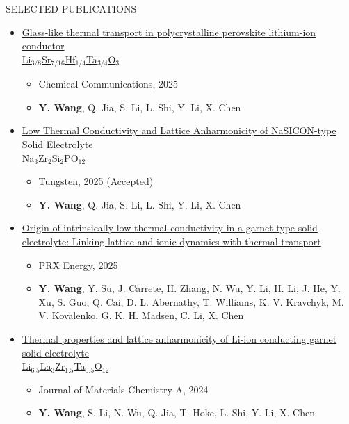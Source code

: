 \documentclass{resume} %
\begin{document}
\begin{rSection}{SELECTED PUBLICATIONS}
\begin{itemize}
\item \href{https://doi.org/10.1039/D5CC04693A}{Glass-like thermal transport in polycrystalline perovskite lithium-ion conductor \\ Li$_{3/8}$Sr$_{7/16}$Hf$_{1/4}$Ta$_{3/4}$O$_3$}
    \begin{itemize}
        \item Chemical Communications, 2025
        \item \textbf{Y. Wang}, Q. Jia, S. Li, L. Shi, Y. Li, X. Chen
    \end{itemize}

\item \href{https://doi.org/10.1007/s42864-025-00357-6}{Low Thermal Conductivity and Lattice Anharmonicity of NaSICON-type Solid Electrolyte \\ Na$_3$Zr$_2$Si$_2$PO$_{12}$}
    \begin{itemize}
        \item Tungsten, 2025 (Accepted)
        \item \textbf{Y. Wang}, Q. Jia, S. Li, L. Shi, Y. Li, X. Chen
    \end{itemize}

\item \href{https://doi.org/10.1103/6wj2-kzhh}{Origin of intrinsically low thermal conductivity in a garnet-type solid electrolyte: Linking lattice and ionic dynamics with thermal transport}
    \begin{itemize}
        \item PRX Energy, 2025
        \item \textbf{Y. Wang}, Y. Su, J. Carrete, H. Zhang, N. Wu, Y. Li, H. Li, J. He, Y. Xu, S. Guo, Q. Cai, D. L. Abernathy, T. Williams, K. V. Kravchyk, M. V. Kovalenko, G. K. H. Madsen, C. Li, X. Chen
    \end{itemize}

\item \href{https://doi.org/10.1039/D4TA02264E}{Thermal properties and lattice anharmonicity of Li-ion conducting garnet solid electrolyte \\ Li$_{6.5}$La$_3$Zr$_{1.5}$Ta$_{0.5}$O$_{12}$}
    \begin{itemize}
        \item Journal of Materials Chemistry A, 2024
        \item \textbf{Y. Wang}, S. Li, N. Wu, Q. Jia, T. Hoke, L. Shi, Y. Li, X. Chen
    \end{itemize}


\end{itemize}
\end{rSection}
\end{document}
